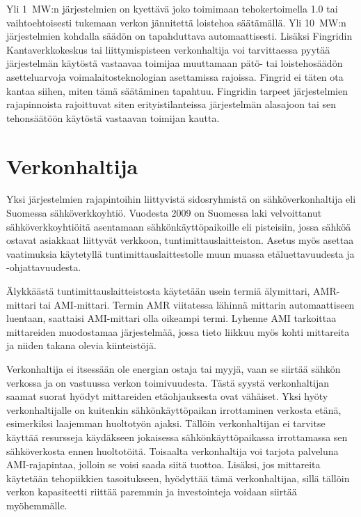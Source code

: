   Yli \SI{1}{\mega\watt}:n järjestelmien on kyettävä joko toimimaan tehokertoimella 1.0 tai vaihtoehtoisesti tukemaan verkon jännitettä loistehoa säätämällä. Yli \SI{10}{\mega\watt}:n järjestelmien kohdalla säädön on tapahduttava automaattisesti. Lisäksi Fingridin Kantaverkkokeskus tai liittymispisteen verkonhaltija voi tarvittaessa pyytää järjestelmän käytöstä vastaavaa toimijaa muuttamaan pätö- tai loistehosäädön asetteluarvoja voimalaitosteknologian asettamissa rajoissa. Fingrid ei täten ota kantaa siihen, miten tämä säätäminen tapahtuu. Fingridin tarpeet järjestelmien rajapinnoista rajoittuvat siten erityistilanteissa järjestelmän alasajoon tai sen tehonsäätöön käytöstä vastaavan toimijan kautta. \parencite{VJV2018}

\section{Verkonhaltija}

  Yksi järjestelmien rajapintoihin liittyvistä sidosryhmistä on sähköverkonhaltija eli Suomessa sähköverkkoyhtiö. Vuodesta 2009 on Suomessa laki velvoittanut sähköverkkoyhtiöitä asentamaan sähkönkäyttöpaikoille eli pisteisiin, jossa sähköä ostavat asiakkaat liittyvät verkkoon, tuntimittauslaitteiston. Asetus myös asettaa vaatimuksia käytetyllä tuntimittauslaittestolle muun muassa etäluettavuudesta ja -ohjattavuudesta. \parencite{mittariAsetus}

  Älykkäästä tuntimittauslaitteistosta käytetään usein termiä älymittari, \gls{AMR}-mittari tai \gls{AMI}-mittari. Termin \gls{AMR} viitatessa lähinnä mittarin automaattiseen luentaan, saattaisi \gls{AMI}-mittari olla oikeampi termi. Lyhenne \gls{AMI} tarkoittaa mittareiden muodostamaa järjestelmää, jossa tieto liikkuu myös kohti mittareita ja niiden takana olevia kiinteistöjä. \parencite{dictOfEnergy}

  Verkonhaltija ei itsessään ole energian ostaja tai myyjä, vaan se siirtää sähkön verkossa ja on vastuussa verkon toimivuudesta. Tästä syystä verkonhaltijan saamat suorat hyödyt mittareiden etäohjauksesta ovat vähäiset. Yksi hyöty verkonhaltijalle on kuitenkin sähkönkäyttöpaikan irrottaminen verkosta etänä, esimerkiksi laajemman huoltotyön ajaksi. Tällöin verkonhaltijan ei tarvitse käyttää resursseja käydäkseen jokaisessa sähkönkäyttöpaikassa irrottamassa sen sähköverkosta ennen huoltotöitä. Toisaalta verkonhaltija voi tarjota palveluna AMI-rajapintaa, jolloin se voisi saada siitä tuottoa. Lisäksi, jos mittareita käytetään tehopiikkien tasoitukseen, hyödyttää tämä verkonhaltijaa, sillä tällöin verkon kapasiteetti riittää paremmin ja investointeja voidaan siirtää myöhemmälle.

